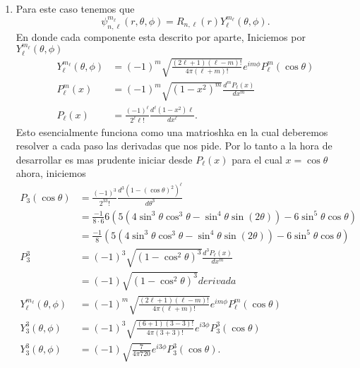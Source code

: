 \documentclass{report}
\begin{document}


\sol

\begin{enumerate}
	\item Para este caso tenemos que \[
		\psi_{n,\ell}^{m_\ell}(r,\theta,\phi) = R_{n,\ell}(r)Y_\ell^{m_\ell}(\theta,\phi)
	.\]En donde cada componente esta descrito por aparte, Iniciemos por $Y_\ell^{m_\ell}(\theta,\phi)$ 
	\begin{align*}
		Y_\ell^{m_\ell}(\theta,\phi) &= (-1)^m\sqrt{\frac{(2\ell+1)(\ell-m)!}{4\pi(\ell+m)!}}e^{im\phi}P_\ell^m(\cos\theta)  \\
		P_\ell^m(x) &= (-1)^m \sqrt{(1-x^2)^m}\frac{d^mP_\ell(x)}{dx^m}  \\
		P_\ell(x) &= \frac{(-1)^{\ell}}{2^\ell\ell!}\frac{d^\ell(1-x^2)\ell}{dx^\ell}
	.\end{align*}
	Esto esencialmente funciona como una matrioshka en la cual deberemos resolver a cada paso las derivadas que nos pide. Por lo tanto a la hora de desarrollar es mas prudente iniciar desde $P_\ell(x)$ para el cual  $x=\cos\theta$ ahora, iniciemos
	\begin{align*}
		P_3(\cos\theta)&=\frac{(-1)^3}{2^33!}\frac{d^3(1-\left( \cos\theta \right) ^2)^\ell}{d\theta^3}\\
		&= \frac{-1}{8\cdot 6} 6(5(4\sin^3\theta\cos^3\theta-\sin^4\theta\sin(2\theta))-6\sin^5\theta\cos\theta)\\%
		&= \frac{-1}{8} (5(4\sin^3\theta\cos^3\theta-\sin^4\theta\sin(2\theta))-6\sin^5\theta\cos\theta)\\%
		P_3^3 &= (-1)^3 \sqrt{(1-\cos^2\theta)^3}\frac{d^3P_\ell(x)}{dx^m}  \\
		&= (-1)\sqrt{(1-\cos^2\theta)^3} derivada \\
		Y_\ell^{m_\ell}(\theta,\phi) &= (-1)^m\sqrt{\frac{(2\ell+1)(\ell-m)!}{4\pi(\ell+m)!}}e^{im\phi}P_\ell^m(\cos\theta)  \\
		Y_3^{3}(\theta,\phi) &= (-1)^3\sqrt{\frac{(6+1)(3-3)!}{4\pi(3+3)!}}e^{i 3\phi}P_3^3(\cos\theta)  \\
		Y_3^{3}(\theta,\phi) &= (-1)\sqrt{\frac{7}{4\pi 720}}e^{i 3\phi}P_3^3(\cos\theta)
	.\end{align*}


\end{enumerate}
\end{document}
